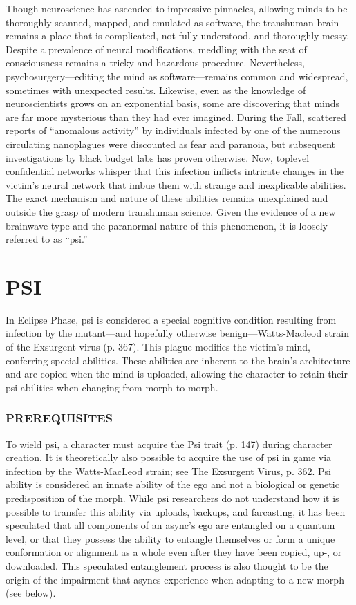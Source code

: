 \newpage



Though neuroscience has ascended to impressive pinnacles, allowing minds to be thoroughly scanned, mapped, and emulated as software, the transhuman brain remains a place that is complicated, not fully understood, and thoroughly messy. Despite a prevalence of neural modifications, meddling with the seat of consciousness remains a tricky and hazardous procedure. Nevertheless, psychosurgery—editing the mind as software—remains common and widespread, sometimes with unexpected results. Likewise, even as the knowledge of neuroscientists grows on an exponential basis, some are discovering that minds are far more mysterious than they had ever imagined. During the Fall, scattered reports of “anomalous activity” by individuals infected by one of the numerous circulating nanoplagues were discounted as fear and paranoia, but subsequent investigations by black budget labs has proven otherwise. Now, toplevel confidential networks whisper that this infection inflicts intricate changes in the victim’s neural network that imbue them with strange and inexplicable abilities. The exact mechanism and nature of these abilities remains unexplained and outside the grasp of modern transhuman science. Given the evidence of a new brainwave type and the paranormal nature of this phenomenon, it is loosely referred to as “psi.” 

\section{PSI} In Eclipse Phase, psi is considered a special cognitive condition resulting from infection by the mutant—and hopefully otherwise benign—Watts-Macleod strain of the Exsurgent virus (p. 367). This plague modifies the victim’s mind, conferring special abilities. These abilities are inherent to the brain’s architecture and are copied when the mind is uploaded, allowing the character to retain their psi abilities when changing from morph to morph. 

\subsubsection{PREREQUISITES} 

To wield psi, a character must acquire the Psi trait (p. 147) during character creation. It is theoretically also possible to acquire the use of psi in game via infection by the Watts-MacLeod strain; see The Exsurgent Virus, p. 362. Psi ability is considered an innate ability of the ego and not a biological or genetic predisposition of the morph. While psi researchers do not understand how it is possible to transfer this ability via uploads, backups, and farcasting, it has been speculated that all components of an async’s ego are entangled on a quantum level, or that they possess the ability to entangle themselves or form a unique conformation or alignment as a whole even after they have been copied, up-, or downloaded. This speculated entanglement process is also thought to be the origin of the impairment that asyncs experience when adapting to a new morph (see below). 

